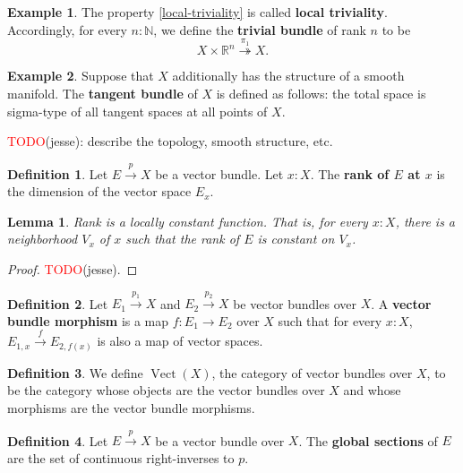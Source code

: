 \documentclass[11pt]{article}
\newcommand{\R}{\mathbb{R}}
\newcommand{\remph}[1]{\textcolor{red}{#1}}
\newcommand{\TODO}{\remph{TODO}}
\newcommand{\Vect}{\operatorname{Vect}}
\theoremstyle{plain}
\newtheorem{lemma}{Lemma}[section]
\theoremstyle{definition}
\newtheorem{definition}{Definition}[section]
\newtheorem{example}{Example}[section]
\newcommand{\N}{\mathbb{N}}
\begin{document}
\begin{example}\label{example-trivial-bundle}
  The property \ref{local-triviality} is called \textbf{local triviality}. Accordingly, for every \(n : \N\), we define the \textbf{trivial bundle} of rank \(n\) to be
  \[
    X \times \R^n \overset{\pi_1}{\twoheadrightarrow} X.
  \]
\end{example}

\begin{example}\label{example-tangent-bundle}
  Suppose that \(X\) additionally has the structure of a smooth manifold. The \textbf{tangent bundle} of \(X\) is defined as follows: the total space is sigma-type of all tangent spaces at all points of \(X\).

  \TODO(jesse): describe the topology, smooth structure, etc.
\end{example}

\begin{definition}\label{def-rank}
  Let \(E \overset{p}{\to} X\) be a vector bundle. Let \(x : X\). The \textbf{rank of \(E\) at \(x\)} is the dimension of the vector space \(E_x\).
\end{definition}

\begin{lemma}\label{lemma-rank-locally-constant}
  Rank is a locally constant function. That is, for every \(x : X\), there is a neighborhood \(V_{x}\) of \(x\) such that the rank of \(E\) is constant on \(V_x\).
\end{lemma}

\begin{proof}
  \TODO(jesse).
\end{proof}

\begin{definition} \label{def-vector-bundle-homomorphism}
  Let \(E_1 \overset{p_1}{\to} X\) and \(E_2 \overset{p_2}{\to} X\) be vector bundles over \(X\).
  A \textbf{vector bundle morphism} is a map \(f : E_1 \to E_2\) over \(X\) such that for every \(x : X\), \(E_{1,x} \overset{f}{\to} E_{2,f(x)}\) is also a map of vector spaces.
\end{definition}

\begin{definition} \label{def-category-vector-bundles}
  We define \(\Vect(X)\), the category of vector bundles over \(X\), to be the category whose objects are the vector bundles over \(X\) and whose morphisms are the vector bundle morphisms.
\end{definition}

\begin{definition}\label{def-global-sections}
  Let \(E \overset{p}{\to} X\) be a vector bundle over \(X\). The \textbf{global sections} of \(E\) are the set of continuous right-inverses to \(p\).
\end{definition}
\end{document}
